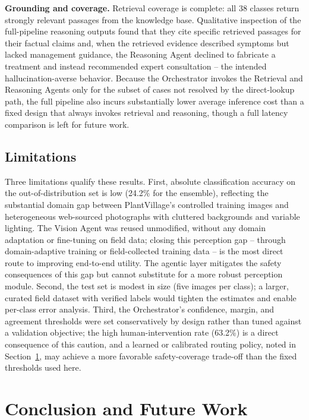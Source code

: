 \documentclass[conference]{IEEEtran}
\begin{document}
\textbf{Grounding and coverage.} Retrieval coverage is complete: all 38 classes return strongly relevant passages from the knowledge base. Qualitative inspection of the full-pipeline reasoning outputs found that they cite specific retrieved passages for their factual claims and, when the retrieved evidence described symptoms but lacked management guidance, the Reasoning Agent declined to fabricate a treatment and instead recommended expert consultation -- the intended hallucination-averse behavior. Because the Orchestrator invokes the Retrieval and Reasoning Agents only for the subset of cases not resolved by the direct-lookup path, the full pipeline also incurs substantially lower average inference cost than a fixed design that always invokes retrieval and reasoning, though a full latency comparison is left for future work.

\subsection{Limitations}
Three limitations qualify these results. First, absolute classification accuracy on the out-of-distribution set is low (24.2\% for the ensemble), reflecting the substantial domain gap between PlantVillage's controlled training images and heterogeneous web-sourced photographs with cluttered backgrounds and variable lighting. The Vision Agent was reused unmodified, without any domain adaptation or fine-tuning on field data; closing this perception gap -- through domain-adaptive training or field-collected training data -- is the most direct route to improving end-to-end utility. The agentic layer mitigates the safety consequences of this gap but cannot substitute for a more robust perception module. Second, the test set is modest in size (five images per class); a larger, curated field dataset with verified labels would tighten the estimates and enable per-class error analysis. Third, the Orchestrator's confidence, margin, and agreement thresholds were set conservatively by design rather than tuned against a validation objective; the high human-intervention rate (63.2\%) is a direct consequence of this caution, and a learned or calibrated routing policy, noted in Section~\ref{sec:conclusion}, may achieve a more favorable safety-coverage trade-off than the fixed thresholds used here.

\section{Conclusion and Future Work}
\label{sec:conclusion}
\end{document}
